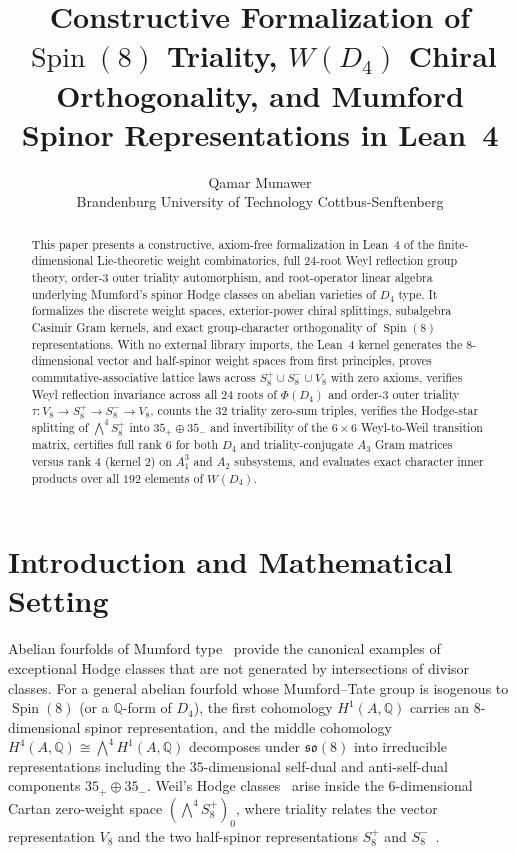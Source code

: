 \documentclass[11pt,a4paper]{article}
\title{\textbf{Constructive Formalization of \texorpdfstring{$\operatorname{Spin}(8)$}{Spin(8)} Triality, \texorpdfstring{$W(D_4)$}{W(D4)} Chiral Orthogonality, and Mumford Spinor Representations in Lean~4}}
\author{Qamar Munawer \\ Brandenburg University of Technology Cottbus-Senftenberg}
\date{}
\begin{document}
\maketitle

\begin{abstract}
This paper presents a constructive, axiom-free formalization in Lean~4 of the finite-dimensional Lie-theoretic weight combinatorics, full $24$-root Weyl reflection group theory, order-$3$ outer triality automorphism, and root-operator linear algebra underlying Mumford's spinor Hodge classes on abelian varieties of $D_4$ type. It formalizes the discrete weight spaces, exterior-power chiral splittings, subalgebra Casimir Gram kernels, and exact group-character orthogonality of $\operatorname{Spin}(8)$ representations. With no external library imports, the Lean~4 kernel generates the $8$-dimensional vector and half-spinor weight spaces from first principles, proves commutative-associative lattice laws across $S^+_8 \cup S^-_8 \cup V_8$ with zero axioms, verifies Weyl reflection invariance across all $24$ roots of $\Phi(D_4)$ and order-$3$ outer triality $\tau : V_8 \to S^+_8 \to S^-_8 \to V_8$, counts the $32$ triality zero-sum triples, verifies the Hodge-star splitting of $\bigwedge^4 S^+_8$ into $35_+ \oplus 35_-$ and invertibility of the $6 \times 6$ Weyl-to-Weil transition matrix, certifies full rank $6$ for both $D_4$ and triality-conjugate $A_3$ Gram matrices versus rank $4$ (kernel $2$) on $A_1^3$ and $A_2$ subsystems, and evaluates exact character inner products over all $192$ elements of $W(D_4)$.
\end{abstract}

\section{Introduction and Mathematical Setting}

Abelian fourfolds of Mumford type~\cite{Mumford1969,Weil1977} provide the canonical examples of exceptional Hodge classes that are not generated by intersections of divisor classes. For a general abelian fourfold whose Mumford--Tate group is isogenous to $\operatorname{Spin}(8)$ (or a $\mathbb{Q}$-form of $D_4$), the first cohomology $H^1(A, \mathbb{Q})$ carries an $8$-dimensional spinor representation, and the middle cohomology $H^4(A, \mathbb{Q}) \cong \bigwedge^4 H^1(A, \mathbb{Q})$ decomposes under $\mathfrak{so}(8)$ into irreducible representations including the $35$-dimensional self-dual and anti-self-dual components $35_+ \oplus 35_-$. Weil's Hodge classes~\cite{Weil1977,vanGeemen1994,Zarhin1984} arise inside the $6$-dimensional Cartan zero-weight space $(\bigwedge^4 S^+_8)_0$, where triality relates the vector representation $V_8$ and the two half-spinor representations $S^+_8$ and $S^-_8$~\cite{Voisin2002}.
\end{document}
